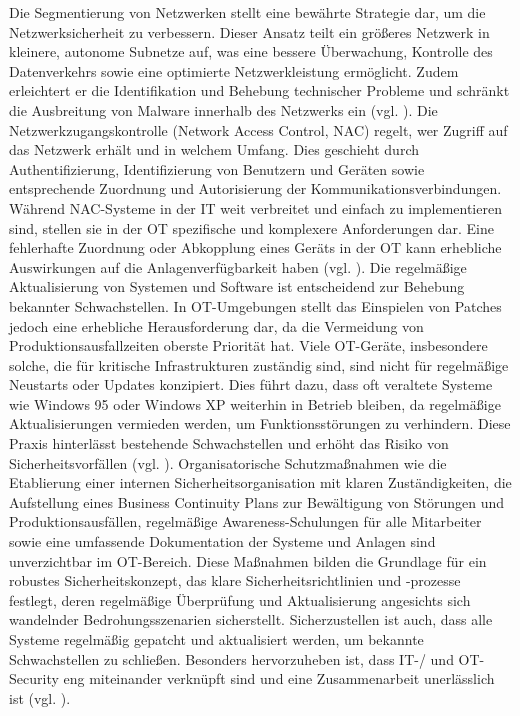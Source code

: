 Die Segmentierung von Netzwerken stellt eine bewährte Strategie dar, um die Netzwerksicherheit zu verbessern. Dieser Ansatz teilt ein größeres Netzwerk in kleinere, autonome Subnetze auf, was eine bessere Überwachung, Kontrolle des Datenverkehrs sowie eine optimierte Netzwerkleistung ermöglicht. Zudem erleichtert er die Identifikation und Behebung technischer Probleme und schränkt die Ausbreitung von Malware innerhalb des Netzwerks ein (vgl. \cite{Netzwerksegmentierung}). Die Netzwerkzugangskontrolle (Network Access Control, NAC) regelt, wer Zugriff auf das Netzwerk erhält und in welchem Umfang. Dies geschieht durch Authentifizierung, Identifizierung von Benutzern und Geräten sowie entsprechende Zuordnung und Autorisierung der Kommunikationsverbindungen. Während NAC-Systeme in der IT weit verbreitet und einfach zu implementieren sind, stellen sie in der OT spezifische und komplexere Anforderungen dar. Eine fehlerhafte Zuordnung oder Abkopplung eines Geräts in der OT kann erhebliche Auswirkungen auf die Anlagenverfügbarkeit haben (vgl. \cite{NAC}). Die regelmäßige Aktualisierung von Systemen und Software ist entscheidend zur Behebung bekannter Schwachstellen. In OT-Umgebungen stellt das Einspielen von Patches jedoch eine erhebliche Herausforderung dar, da die Vermeidung von Produktionsausfallzeiten oberste Priorität hat. Viele OT-Geräte, insbesondere solche, die für kritische Infrastrukturen zuständig sind, sind nicht für regelmäßige Neustarts oder Updates konzipiert. Dies führt dazu, dass oft veraltete Systeme wie Windows 95 oder Windows XP weiterhin in Betrieb bleiben, da regelmäßige Aktualisierungen vermieden werden, um Funktionsstörungen zu verhindern. Diese Praxis hinterlässt bestehende Schwachstellen und erhöht das Risiko von Sicherheitsvorfällen (vgl. \cite{conscia}). 
\noindent Organisatorische Schutzmaßnahmen wie die Etablierung einer internen Sicherheitsorganisation mit klaren Zuständigkeiten, die Aufstellung eines Business Continuity Plans zur Bewältigung von Störungen und Produktionsausfällen, regelmäßige Awareness-Schulungen für alle Mitarbeiter sowie eine umfassende Dokumentation der Systeme und Anlagen sind unverzichtbar im OT-Bereich. Diese Maßnahmen bilden die Grundlage für ein robustes Sicherheitskonzept, das klare Sicherheitsrichtlinien und -prozesse festlegt, deren regelmäßige Überprüfung und Aktualisierung angesichts sich wandelnder Bedrohungsszenarien sicherstellt. Sicherzustellen ist auch, dass alle Systeme regelmäßig gepatcht und aktualisiert werden, um bekannte Schwachstellen zu schließen. Besonders hervorzuheben ist, dass IT-/ und OT-Security eng miteinander verknüpft sind und eine Zusammenarbeit unerlässlich ist (vgl. \cite{orga}). 


